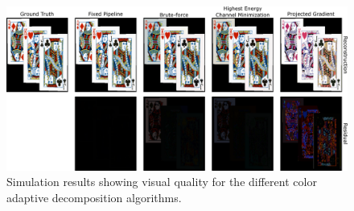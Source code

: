 \begin{figure}[h!]
\centering
\includegraphics[width=0.99\columnwidth]{images/volumetric/cad_results/cad_visual_quality}
\caption[Color Adaptive Decomposition: visual quality]{Simulation results showing visual quality for the different color adaptive decomposition algorithms.}
\label{fig:volumetric:cad:visual_quality}
\end{figure}

